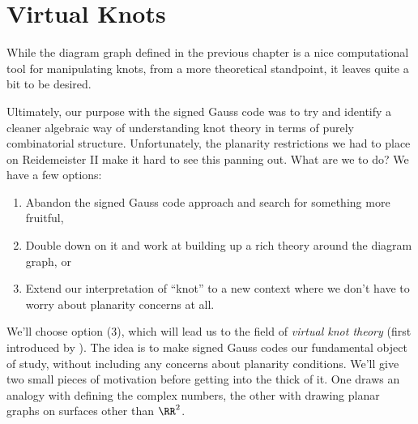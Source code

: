 \section{Virtual Knots}\label{sec:virtual-knots}
While the diagram graph defined in the previous chapter is a nice
computational tool for manipulating knots, from a more theoretical
standpoint, it leaves quite a bit to be desired.

Ultimately, our purpose with the signed Gauss code was to try and
identify a cleaner algebraic way of understanding knot theory in terms
of purely combinatorial structure. Unfortunately, the planarity
restrictions we had to place on Reidemeister II make it hard to see
this panning out. What are we to do? We have a few options:
\begin{enumerate}[label=\arabic*)]
  \item Abandon the signed Gauss code approach and search for
    something more fruitful,
  \item Double down on it and work at building up a rich theory around
    the diagram graph, or
  \item Extend our interpretation of ``knot'' to a new context where
    we don't have to worry about planarity concerns at all.
\end{enumerate}
We'll choose option (3), which will lead us to the field of
\emph{virtual knot theory} (first introduced by
\cite{Kauffman1998Nov}). The idea is to make signed Gauss codes our
fundamental object of study, without including any concerns about
planarity conditions. We'll give two small pieces of motivation before
getting into the thick of it. One draws an analogy with defining the
complex numbers, the other with drawing planar graphs on surfaces
other than $\RR^2$.\\

